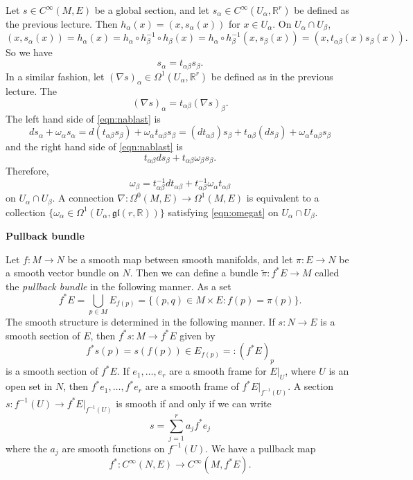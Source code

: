 \documentclass{amsart}
\numberwithin{equation}{section}
\newcommand{\bR}{\mathbb{R}}
\newcommand{\fgl}{\mathfrak{gl}}
\theoremstyle{definition}
\theoremstyle{theorem}
\begin{document}
Let $s \in C^\infty(M,E)$ be a global section, and let $s_\alpha\in C^\infty(U_\alpha,\bR^r)$ be defined
as the previous lecture. Then $h_\alpha(x)=(x,s_\alpha(x))$ for $x\in U_\alpha$. On $U_\alpha\cap U_\beta$,
$$
(x,s_\alpha(x))= h_\alpha(x)= h_\alpha\circ h_\beta^{-1}\circ h_\beta(x)= h_\alpha \circ h_\beta^{-1}(x,s_\beta(x))
=(x,t_{\alpha\beta}(x)s_\beta(x)).
$$
So we have
\begin{equation}\label{eqn:st}
s_\alpha = t_{\alpha\beta} s_\beta.
\end{equation}
In a similar fashion, let $(\nabla s)_\alpha\in \Omega^1(U_\alpha,\bR^r)$ be defined as in the previous lecture. The 
\begin{equation}\label{eqn:nablast}
(\nabla s)_\alpha = t_{\alpha\beta}(\nabla s)_\beta.
\end{equation}
The left hand side of \eqref{eqn:nablast} is
$$
ds_\alpha +\omega_\alpha s_\alpha = d(t_{\alpha\beta}s_\beta) + \omega_\alpha t_{\alpha\beta} s_\beta
= (dt_{\alpha\beta}) s_\beta + t_{\alpha\beta} (ds_\beta) + \omega_\alpha t_{\alpha\beta} s_\beta
$$
and the right hand side of \eqref{eqn:nablast} is
$$
t_{\alpha\beta}ds_\beta + t_{\alpha\beta} \omega_\beta s_\beta . 
$$
Therefore,
\begin{equation}\label{eqn:omegat}
\omega_\beta = t_{\alpha\beta}^{-1} dt_{\alpha\beta} + t_{\alpha\beta}^{-1} \omega_\alpha t_{\alpha\beta}
\end{equation}
on $U_\alpha\cap U_\beta$. A connection $\nabla: \Omega^0(M,E)\to \Omega^1(M,E)$ is equivalent to 
a collection $\{ \omega_\alpha \in \Omega^1(U_\alpha,\fgl(r,\bR))\}$ satisfying \eqref{eqn:omegat}
on $U_\alpha\cap U_\beta$. 


\medskip

\noindent
{\bf \large Pullback bundle}

\smallskip

Let $f : M \to N$ be a smooth map between smooth manifolds, and let $\pi :E \to N$ be a smooth vector bundle on $N$. Then we can define a 
bundle $\tilde{\pi} : f^*E \to M$ called the {\em pullback bundle} in the following manner. As a set 
\[
f^*E = \bigcup_{p \in M}E_{f(p)} = \{(p,q) \in M \times E : f(p) = \pi(p)\}.
\]
The smooth structure is determined in the following manner. If $s : N \to E$ is a smooth section of $E$, then $f^*s : M \to f^*E$ given by 
\[
f^*s(p) = s(f(p)) \in E_{f(p)} =: (f^*E)_p
\]
is a smooth section of $f^*E$. If $e_1, \ldots, e_r$ are a smooth frame for $E|_U$, where $U$ is an open set in $N$, then
$f^*e_1, \ldots, f^*e_r$ are a smooth frame of $f^*E|_{f^{-1}(U)}$.  A section $s : f^{-1}(U) \to f^*E|_{f^{-1}(U)}$ is smooth if and only if 
we can write 
\[
s = \sum_{j=1}^r a_j f^*e_j
\]
where the $a_j$ are smooth functions on $f^{-1}(U)$.  We have a pullback map 
$$
f^*:C^\infty(N,E)\to C^\infty(M,f^*E).
$$
\end{document}
